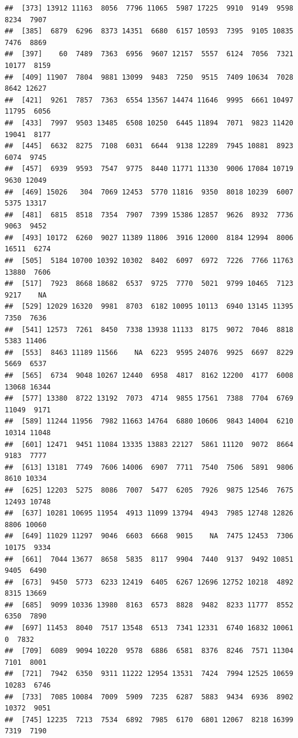 \documentclass[
]{article}
\begin{document}
\begin{verbatim}
##  [373] 13912 11163  8056  7796 11065  5987 17225  9910  9149  9598  8234  7907
##  [385]  6879  6296  8373 14351  6680  6157 10593  7395  9105 10835  7476  8869
##  [397]    60  7489  7363  6956  9607 12157  5557  6124  7056  7321 10177  8159
##  [409] 11907  7804  9881 13099  9483  7250  9515  7409 10634  7028  8642 12627
##  [421]  9261  7857  7363  6554 13567 14474 11646  9995  6661 10497 11795  6056
##  [433]  7997  9503 13485  6508 10250  6445 11894  7071  9823 11420 19041  8177
##  [445]  6632  8275  7108  6031  6644  9138 12289  7945 10881  8923  6074  9745
##  [457]  6939  9593  7547  9775  8440 11771 11330  9006 17084 10719  9630 12049
##  [469] 15026   304  7069 12453  5770 11816  9350  8018 10239  6007  5375 13317
##  [481]  6815  8518  7354  7907  7399 15386 12857  9626  8932  7736  9063  9452
##  [493] 10172  6260  9027 11389 11806  3916 12000  8184 12994  8006 16511  6274
##  [505]  5184 10700 10392 10302  8402  6097  6972  7226  7766 11763 13880  7606
##  [517]  7923  8668 18682  6537  9725  7770  5021  9799 10465  7123  9217    NA
##  [529] 12029 16320  9981  8703  6182 10095 10113  6940 13145 11395  7350  7636
##  [541] 12573  7261  8450  7338 13938 11133  8175  9072  7046  8818  5383 11406
##  [553]  8463 11189 11566    NA  6223  9595 24076  9925  6697  8229  5669  6537
##  [565]  6734  9048 10267 12440  6958  4817  8162 12200  4177  6008 13068 16344
##  [577] 13380  8722 13192  7073  4714  9855 17561  7388  7704  6769 11049  9171
##  [589] 11244 11956  7982 11663 14764  6880 10606  9843 14004  6210 10314 11048
##  [601] 12471  9451 11084 13335 13883 22127  5861 11120  9072  8664  9183  7777
##  [613] 13181  7749  7606 14006  6907  7711  7540  7506  5891  9806  8610 10334
##  [625] 12203  5275  8086  7007  5477  6205  7926  9875 12546  7675 12493 10748
##  [637] 10281 10695 11954  4913 11099 13794  4943  7985 12748 12826  8806 10060
##  [649] 11029 11297  9046  6603  6668  9015    NA  7475 12453  7306 10175  9334
##  [661]  7044 13677  8658  5835  8117  9904  7440  9137  9492 10851  9405  6490
##  [673]  9450  5773  6233 12419  6405  6267 12696 12752 10218  4892  8315 13669
##  [685]  9099 10336 13980  8163  6573  8828  9482  8233 11777  8552  6350  7890
##  [697] 11453  8040  7517 13548  6513  7341 12331  6740 16832 10061     0  7832
##  [709]  6089  9094 10220  9578  6886  6581  8376  8246  7571 11304  7101  8001
##  [721]  7942  6350  9311 11222 12954 13531  7424  7994 12525 10659 10283  6746
##  [733]  7085 10084  7009  5909  7235  6287  5883  9434  6936  8902 10372  9051
##  [745] 12235  7213  7534  6892  7985  6170  6801 12067  8218 16399  7319  7190

\end{verbatim}
\end{document}

